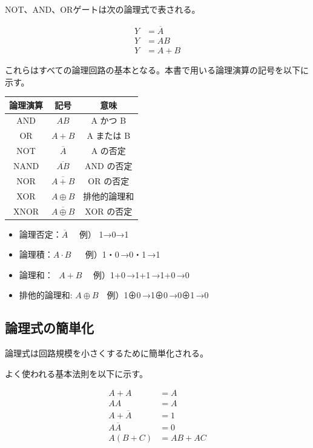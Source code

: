 NOT、AND、ORゲートは次の論理式で表される。

\begin{align}
Y &= \overline{A} \\
Y &= AB \\
Y &= A + B
\end{align}

これらはすべての論理回路の基本となる。本書で用いる論理演算の記号を以下に示す。

\begin{center}
\begin{tabular}{ccc}
\toprule
論理演算 & 記号 & 意味 \\
\midrule
AND & $AB$ & A かつ B \\
OR  & $A + B$ & A または B \\
NOT & $\overline{A}$ & A の否定 \\
NAND & $\overline{AB}$ & AND の否定 \\
NOR & $\overline{A+B}$ & OR の否定 \\
XOR & $A \oplus B$ & 排他的論理和 \\
XNOR & $\overline{A \oplus B}$ & XOR の否定 \\
\bottomrule
\end{tabular}
\end{center}
\begin{itemize}
  \item 論理否定：$\overline{A}$  　例） 1→0→1
  \item 論理積：${A}\cdot{B}$    　 例）1・0\,→0・1\,→1
  \item 論理和： \,\,${A}+{B}$   　例）1+0\,→1+1\,→1+0\,→0
  \item 排他的論理和: ${A}\oplus{B}$　例）1⊕0\,→1⊕0\,→0⊕1\,→0\quad
\end{itemize}
\subsection{論理式の簡単化}

論理式は回路規模を小さくするために簡単化される。

よく使われる基本法則を以下に示す。

\begin{align}
A + A &= A \\
AA &= A \\
A + \overline{A} &= 1 \\
A\overline{A} &= 0 \\
A(B + C) &= AB + AC
\end{align}


